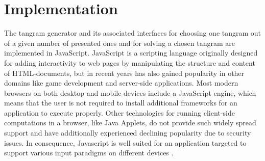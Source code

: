 \chapter{Implementation} \label{chapter:implementation}

The tangram generator and its associated interfaces for choosing one tangram out of a given number of presented ones and for solving a chosen tangram are implemented in JavaScript. JavaScript is a scripting language originally designed for adding interactivity to web pages by manipulating the structure and content of HTML-documents, but in recent years has also gained popularity in other domains like game development and server-side applications. Most modern browsers on both desktop and mobile devices include a JavaScript engine, which means that the user is not required to install additional frameworks for an application to execute properly. Other technologies for running client-side computations in a browser, like Java Applets, do not provide such widely spread support and have additionally experienced declining popularity due to security issues. In consequence, Javascript is well suited for an application targeted to support various input paradigms on different devices \cite{mdn15}.

